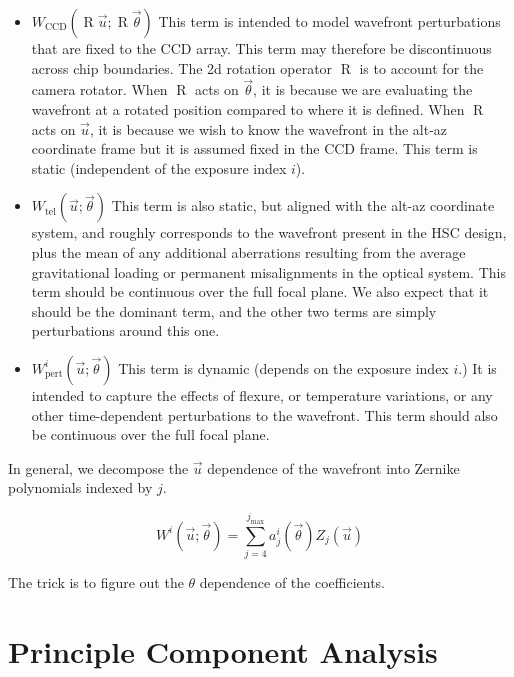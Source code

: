\documentclass{article}
\DeclareMathOperator{\R}{R}
\begin{document}
\begin{itemize}

  \item $W_\mathrm{CCD}\left(\R \vec{u}; \R \vec{\theta}\right)$  This term is intended to model
  wavefront perturbations that are fixed to the CCD array.  This term may therefore be
  discontinuous across chip boundaries. The 2d rotation operator $\R$ is to account for the camera
  rotator.  When $\R$ acts on $\vec{\theta}$, it is because we are evaluating the wavefront at a
  rotated position compared to where it is defined.  When $\R$ acts on $\vec{u}$, it is because we
  wish to know the wavefront in the alt-az coordinate frame but it is assumed fixed in the CCD
  frame.  This term is static (independent of the exposure index $i$).

  \item $W_\mathrm{tel}\left(\vec{u}; \vec{\theta}\right)$  This term is also static, but aligned
  with the alt-az coordinate system, and roughly corresponds to the wavefront present in the HSC
  design, plus the mean of any additional aberrations resulting from the average gravitational
  loading or permanent misalignments in the optical system.  This term should be continuous over
  the full focal plane.  We also expect that it should be the dominant term, and the other two
  terms are simply perturbations around this one.

  \item $W_\mathrm{pert}^i\left(\vec{u}; \vec{\theta}\right)$  This term is dynamic (depends on
  the exposure index $i$.)  It is intended to capture the effects of flexure, or temperature
  variations, or any other time-dependent perturbations to the wavefront.  This term should also
  be continuous over the full focal plane.

\end{itemize}

In general, we decompose the $\vec{u}$ dependence of the wavefront into Zernike polynomials indexed
by $j$.

\begin{equation}
    W^i\left(\vec{u}; \vec{\theta}\right) = \sum_{j=4}^{j_\mathrm{max}} a_j^i(\vec{\theta}) Z_j(\vec{u})
\end{equation}

The trick is to figure out the $\theta$ dependence of the coefficients.

\section{Principle Component Analysis}
\end{document}
